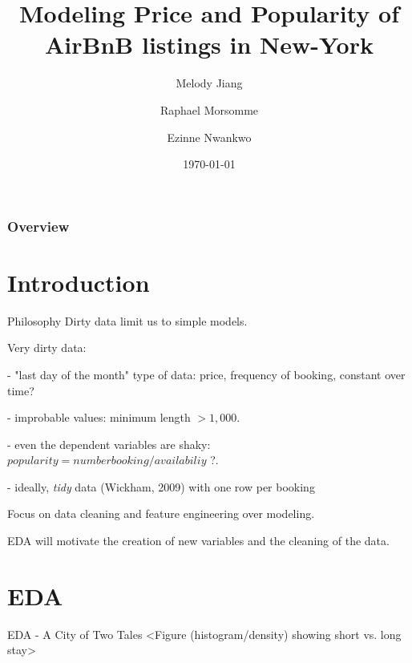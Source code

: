 \documentclass{beamer}
\title[AirBnB in New-York - Exploratory Data Analysis]{Modeling Price and Popularity of AirBnB listings in New-York} %
\author[Jiang, Morsomme, Nwankwo]{Melody Jiang \and Raphael Morsomme \and Ezinne Nwankwo}
\institute[Stat 723]{Case Study 2 - Stat 723}
\date{\today} %
\begin{document}
	
	\begin{frame}
	\titlepage %
	\end{frame}

\begin{frame}
	\frametitle{Overview} %
	\tableofcontents %
\end{frame}



\section{Introduction}
\begin{frame}{Philosophy}
Dirty data limit us to simple models.

Very dirty data:

- "last day of the month" type of data: price, frequency of booking, constant over time?

- improbable values: minimum length $> 1,000$.

- even the dependent variables are shaky: $ popularity = number booking / availabiliy$ ?.

- ideally, \textit{tidy} data (Wickham, 2009) with one row per booking

Focus on data cleaning and feature engineering over modeling.

EDA will motivate the creation of new variables and the cleaning of the data.
\end{frame}



\section{EDA}

\begin{frame}{EDA - A City of Two Tales}
<Figure (histogram/density) showing short vs. long stay>
\end{frame}
\end{document}
